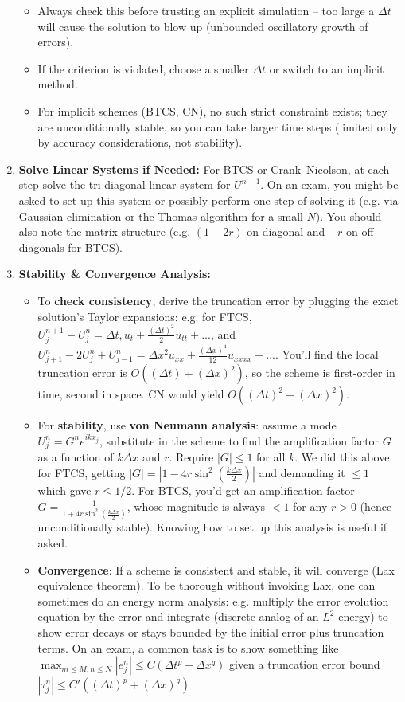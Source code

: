 \documentclass[a4paper,11pt]{article}
\begin{document}
\begin{enumerate}
\begin{itemize}
              \item Always check this before trusting an explicit simulation -- too large a $\Delta t$ will cause the solution to blow up (unbounded oscillatory growth of errors).

              \item If the criterion is violated, choose a smaller $\Delta t$ or switch to an implicit method.
                    \medskip
              \item For implicit schemes (BTCS, CN), no such strict constraint exists; they are unconditionally stable, so you can take larger time steps (limited only by accuracy considerations, not stability).
          \end{itemize}
    \item \textbf{Solve Linear Systems if Needed:} For BTCS or Crank--Nicolson, at each step solve the tri-diagonal linear system for $U^{n+1}$. On an exam, you might be asked to set up this system or possibly perform one step of solving it (e.g. via Gaussian elimination or the Thomas algorithm for a small $N$). You should also note the matrix structure (e.g. $(1+2r)$ on diagonal and $-r$ on off-diagonals for BTCS).
    \item \textbf{Stability \& Convergence Analysis:}
          \begin{itemize}
              \item To \textbf{check consistency}, derive the truncation error by plugging the exact solution’s Taylor expansions: e.g. for FTCS, $U_j^{n+1}-U_j^n = \Delta t, u_t + \frac{(\Delta t)^2}{2}u_{tt} + ...$, and $U_{j+1}^n - 2U_j^n + U_{j-1}^n = \Delta x^2 u_{xx} + \frac{(\Delta x)^4}{12}u_{xxxx}+...$. You’ll find the local truncation error is $O((\Delta t) + (\Delta x)^2)$, so the scheme is first-order in time, second in space. CN would yield $O((\Delta t)^2 + (\Delta x)^2)$.
              \item For \textbf{stability}, use \textbf{von Neumann analysis}: assume a mode $U_j^n = G^n e^{i k x_j}$, substitute in the scheme to find the amplification factor $G$ as a function of $k\Delta x$ and $r$. Require $|G|\le 1$ for all $k$. We did this above for FTCS, getting $|G| = |1 - 4r\sin^2(\frac{k\Delta x}{2})|$ and demanding it $\le 1$ which gave $r\le 1/2$. For BTCS, you’d get an amplification factor $G = \frac{1}{1+4r\sin^2(\frac{k\Delta x}{2})}$, whose magnitude is always $<1$ for any $r>0$ (hence unconditionally stable). Knowing how to set up this analysis is useful if asked.
              \item \textbf{Convergence}: If a scheme is consistent and stable, it will converge (Lax equivalence theorem). To be thorough without invoking Lax, one can sometimes do an energy norm analysis: e.g. multiply the error evolution equation by the error and integrate (discrete analog of an $L^2$ energy) to show error decays or stays bounded by the initial error plus truncation terms. On an exam, a common task is to show something like $\max_{m\le M, n\le N} |e_j^n| \le C(\Delta t^p + \Delta x^q)$ given a truncation error bound $|\tau_j^n| \le C'((\Delta t)^p + (\Delta x)^q)$

\end{itemize}
\end{enumerate}
\end{document}
